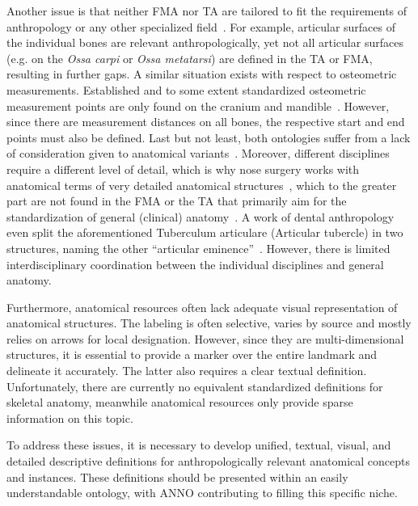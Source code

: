 \documentclass[sw]{iosart2x}
\begin{document}
Another issue is that neither FMA nor TA are tailored to fit the requirements of anthropology or any other specialized field~\citep{fma}.
For example, articular surfaces of the individual bones are relevant anthropologically, yet not all articular surfaces (e.g. on the \emph{Ossa carpi} or \emph{Ossa metatarsi}) are defined in the TA or FMA, resulting in further gaps.
A similar situation exists with respect to osteometric measurements.
Established and to some extent standardized osteometric measurement points are only found on the cranium and mandible~\citep{wesenanthropologie}.
However, since there are measurement distances on all bones, the respective start and end points must also be defined.
Last but not least, both ontologies suffer from a lack of consideration given to anatomical variants~\citep{anatomycontribution}.
Moreover, different disciplines require a different level of detail, which is why nose surgery works with anatomical terms of very detailed anatomical structures~\citep{graysanatomy},
which to the greater part are not found in the FMA or the TA that primarily aim for the standardization of general (clinical) anatomy~\citep{fma}.
A work of dental anthropology even split the aforementioned Tuberculum articulare (Articular tubercle) in two structures, naming the other \enquote{articular eminence}~\citep{dentalanthropology}.
However, there is limited interdisciplinary coordination between the individual disciplines and general anatomy.

Furthermore, anatomical resources often lack adequate visual representation of anatomical structures.
The labeling is often selective, varies by source and mostly relies on arrows for local designation.
However, since they are multi-dimensional structures, it is essential to provide a marker over the entire landmark and delineate it accurately.
The latter also requires a clear textual definition.
Unfortunately, there are currently no equivalent standardized definitions for skeletal anatomy, meanwhile anatomical resources only provide sparse information on this topic.

To address these issues, it is necessary to develop unified, textual, visual, and detailed descriptive definitions for anthropologically relevant anatomical concepts and instances.
These definitions should be presented within an easily understandable ontology, with ANNO contributing to filling this specific niche.
\end{document}
